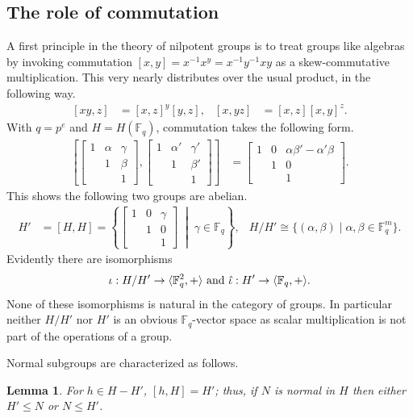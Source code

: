 \documentclass{toc}
\numberwithin{equation}{section}
\theoremstyle{plain}       %
\newtheorem{lem}[equation]{Lemma}
\theoremstyle{remark}
\theoremstyle{definition}
\numberwithin{figure}{section}
\numberwithin{table}{section}
\newcommand{\bbF}{\mathbb{F}}  %
\begin{document}
\subsection{The role of commutation}
A first principle in the theory of nilpotent groups is to treat groups like
algebras by invoking commutation $[x,y]=x^{-1}x^y=x^{-1}y^{-1}xy$ as a
skew-commutative multiplication.  This very nearly distributes over the usual
product, in the following way.
\begin{align}\label{eq:comm-id}
	[xy,z] & = [x,z]^y [y,z], & [x,yz] & = [x,z][x,y]^z.
\end{align}
With $q=p^e$ and $H=H(\bbF_q)$, commutation takes the following form.
\begin{align}\label{eq:comm-H}
	\left[
	\begin{bmatrix}
	1 & \alpha & \gamma\\ & 1 & \beta\\ & & 1 
	\end{bmatrix},
	\begin{bmatrix}
	1 & \alpha' & \gamma'\\ & 1 & \beta'\\ & & 1 
	\end{bmatrix}
	\right] 
	& = 
	\begin{bmatrix}
	1 & 0 & \alpha \beta'-\alpha'\beta\\ & 1 & 0\\ & & 1 
	\end{bmatrix}.
\end{align}
This shows the following two groups are abelian.
\begin{align*}
	H' & = [H,H] =\left\{ 
		\begin{bmatrix} 1 & 0 & \gamma\\ & 1 & 0\\ & & 1 \end{bmatrix} 
	\;\middle|\; \gamma \in\bbF_{q}\right\}, & H/H'\cong \{(\alpha,\beta) \mid 
	\alpha,\beta\in \bbF_q^m\}.
\end{align*}
Evidently there are isomorphisms 
\begin{align}\label{def:iota}
	\iota:H/H'\to \langle \bbF_q^2,+\rangle\textnormal{ and }
	\hat{\iota}:H'\to \langle\bbF_q,+\rangle.
\end{align}
None of these isomorphisms is natural in the category of groups.  In particular
neither $H/H'$ nor $H'$ is an obvious $\bbF_q$-vector space as scalar
multiplication is not part of the operations of a group.  

Normal subgroups are characterized as follows.
\begin{lem}\label{lem:quo}
For $h\in H-H'$, $[h,H]=H'$; thus, if $N$ is normal in $H$ then either $H'\leq N$ or $N\leq H'$. 
\end{lem}
\end{document}
